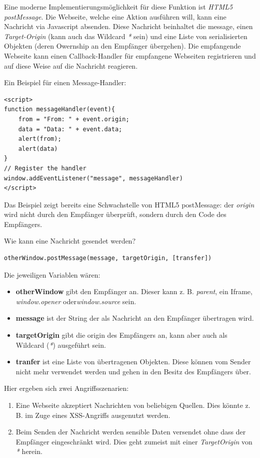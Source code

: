 Eine moderne Implementierungsmöglichkeit für diese Funktion ist \textit{HTML5 postMessage}. Die Webseite, welche eine Aktion ausführen will, kann eine Nachricht via Javascript absenden. Diese Nachricht beinhaltet die message, einen \textit{Target-Origin} (kann auch das Wildcard \textit{*} sein) und eine Liste von serialisierten Objekten (deren Owernship an den Empfänger übergehen). Die empfangende Webseite kann einen Callback-Handler für empfangene Webseiten registrieren und auf diese Weise auf die Nachricht reagieren.

Ein Beispiel für einen Message-Handler:

\begin{verbatim}
<script>
function messageHandler(event){
	from = "From: " + event.origin;
	data = "Data: " + event.data;
	alert(from);
	alert(data)
}
// Register the handler
window.addEventListener("message", messageHandler)
</script>
\end{verbatim}

Das Beispiel zeigt bereits eine Schwachstelle von HTML5 postMessage: der \textit{origin} wird nicht durch den Empfänger überprüft, sondern durch den Code des Empfängers.

Wie kann eine Nachricht gesendet werden?

\begin{verbatim}
otherWindow.postMessage(message, targetOrigin, [transfer])
\end{verbatim}

Die jeweiligen Variablen wären:

\begin{itemize}
\item \textbf{otherWindow} gibt den Empfänger an. Dieser kann z. B. \textit{parent}, ein Iframe, \textit{window.opener} oder\textit{window.source} sein.
\item \textbf{message} ist der String der als Nachricht an den Empfänger übertragen wird.
\item \textbf{targetOrigin} gibt die origin des Empfängers an, kann aber auch als Wildcard (\textit{*}) ausgeführt sein.
\item \textbf{tranfer} ist eine Liste von übertragenen Objekten. Diese können vom Sender nicht mehr verwendet werden und gehen in den Besitz des Empfängers über.
\end{itemize}

Hier ergeben sich zwei Angriffsszenarien:

\begin{enumerate}
	\item Eine Webseite akzeptiert Nachrichten von beliebigen Quellen. Dies könnte z. B. im Zuge eines XSS-Angriffs ausgenutzt werden.
	\item Beim Senden der Nachricht werden sensible Daten versendet ohne dass der Empfänger eingeschränkt wird. Dies geht zumeist mit einer \textit{TargetOrigin} von \textit{*} herein.
\end{enumerate}

